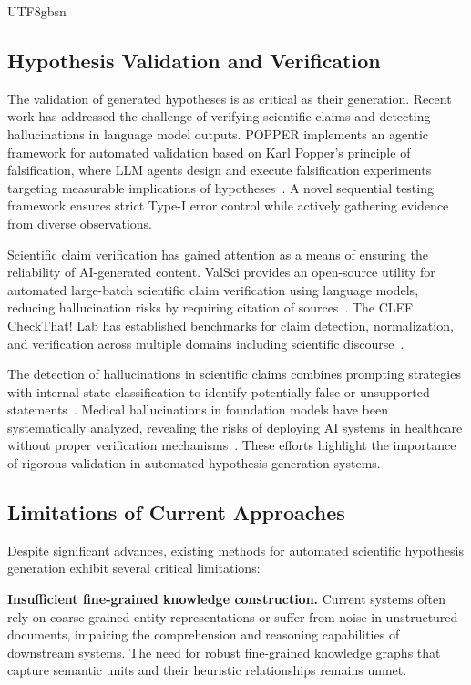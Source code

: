 \documentclass[11pt]{article}
\begin{document}
\begin{CJK}{UTF8}{gbsn}
\subsection{Hypothesis Validation and Verification}

The validation of generated hypotheses is as critical as their generation. Recent work has addressed the challenge of verifying scientific claims and detecting hallucinations in language model outputs. POPPER implements an agentic framework for automated validation based on Karl Popper's principle of falsification, where LLM agents design and execute falsification experiments targeting measurable implications of hypotheses~\cite{huang2025automated}. A novel sequential testing framework ensures strict Type-I error control while actively gathering evidence from diverse observations.

Scientific claim verification has gained attention as a means of ensuring the reliability of AI-generated content. ValSci provides an open-source utility for automated large-batch scientific claim verification using language models, reducing hallucination risks by requiring citation of sources~\cite{edelman2025valsci}. The CLEF CheckThat! Lab has established benchmarks for claim detection, normalization, and verification across multiple domains including scientific discourse~\cite{alam2025overview}.

The detection of hallucinations in scientific claims combines prompting strategies with internal state classification to identify potentially false or unsupported statements~\cite{cao2025detecting}. Medical hallucinations in foundation models have been systematically analyzed, revealing the risks of deploying AI systems in healthcare without proper verification mechanisms~\cite{kim2025medical}. These efforts highlight the importance of rigorous validation in automated hypothesis generation systems.

\subsection{Limitations of Current Approaches}

Despite significant advances, existing methods for automated scientific hypothesis generation exhibit several critical limitations:

\textbf{Insufficient fine-grained knowledge construction.} Current systems often rely on coarse-grained entity representations or suffer from noise in unstructured documents, impairing the comprehension and reasoning capabilities of downstream systems. The need for robust fine-grained knowledge graphs that capture semantic units and their heuristic relationships remains unmet.


\end{CJK}
\end{document}
